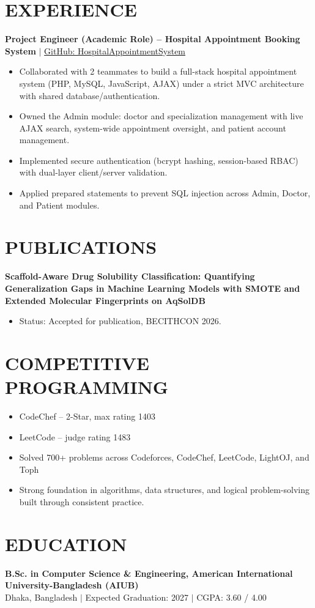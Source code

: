 \documentclass[9.5pt,a4paper]{article}
\begin{document}
\section*{EXPERIENCE}

\textbf{Project Engineer (Academic Role) -- Hospital Appointment Booking System} \quad $|$ \quad \href{https://github.com/Kazi-Sadman/HospitalAppointmentSystem}{GitHub: HospitalAppointmentSystem}
\begin{itemize}
    \item Collaborated with 2 teammates to build a full-stack hospital appointment system (PHP, MySQL, JavaScript, AJAX) under a strict MVC architecture with shared database/authentication.
    \item Owned the Admin module: doctor and specialization management with live AJAX search, system-wide appointment oversight, and patient account management.
    \item Implemented secure authentication (bcrypt hashing, session-based RBAC) with dual-layer client/server validation.
    \item Applied prepared statements to prevent SQL injection across Admin, Doctor, and Patient modules.
\end{itemize}

\section*{PUBLICATIONS}

\textbf{Scaffold-Aware Drug Solubility Classification: Quantifying Generalization Gaps in Machine Learning Models with SMOTE and Extended Molecular Fingerprints on AqSolDB}
\begin{itemize}
    \item Status: Accepted for publication, BECITHCON 2026.
\end{itemize}

\section*{COMPETITIVE PROGRAMMING}
\begin{itemize}
    \item CodeChef -- 2-Star, max rating 1403
    \item LeetCode -- judge rating 1483
    \item Solved 700+ problems across Codeforces, CodeChef, LeetCode, LightOJ, and Toph
    \item Strong foundation in algorithms, data structures, and logical problem-solving built through consistent practice.
\end{itemize}

\section*{EDUCATION}
\textbf{B.Sc. in Computer Science \& Engineering, American International University-Bangladesh (AIUB)} \\
Dhaka, Bangladesh \quad $|$ \quad Expected Graduation: 2027 \quad $|$ \quad CGPA: 3.60 / 4.00
\end{document}

